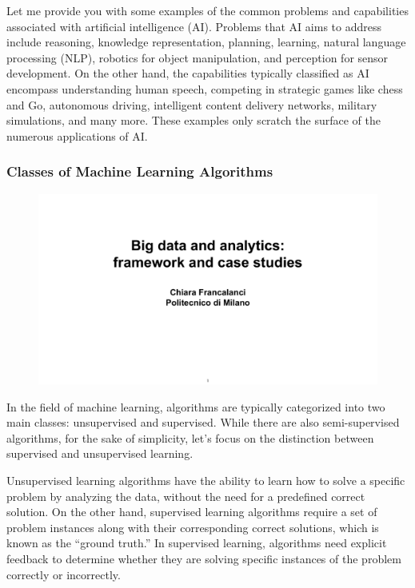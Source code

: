 Let me provide you with some examples of the common problems and
capabilities associated with artificial intelligence (AI). Problems that
AI aims to address include reasoning, knowledge representation,
planning, learning, natural language processing (NLP), robotics for
object manipulation, and perception for sensor development. On the other
hand, the capabilities typically classified as AI encompass
understanding human speech, competing in strategic games like chess and
Go, autonomous driving, intelligent content delivery networks, military
simulations, and many more. These examples only scratch the surface of
the numerous applications of AI.


\subsubsection{Classes of Machine Learning
    Algorithms}\label{classes-of-machine-learning-algorithms}

\begin{figure}[!h]
    \centering
    \includegraphics[page=6, trim = 1.5cm 4cm 1.5cm 4cm, clip, width=\textwidth]{images/06 - BIG_DATA.pdf}
\end{figure}

In the field of machine learning, algorithms are typically categorized
into two main classes: unsupervised and supervised. While there are also
semi-supervised algorithms, for the sake of simplicity, let's focus on
the distinction between supervised and unsupervised learning.

Unsupervised learning algorithms have the ability to learn how to solve
a specific problem by analyzing the data, without the need for a
predefined correct solution. On the other hand, supervised learning
algorithms require a set of problem instances along with their
corresponding correct solutions, which is known as the ``ground truth.''
In supervised learning, algorithms need explicit feedback to determine
whether they are solving specific instances of the problem correctly or
incorrectly.

